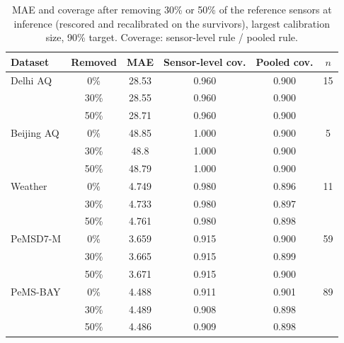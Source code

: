 \begin{table}[htbp]
\caption{MAE and coverage after removing 30\% or 50\% of the reference sensors at inference (rescored and recalibrated on the survivors), largest calibration size, 90\% target. Coverage: sensor-level rule / pooled rule.}
\label{tab:removalfull}
\centering\small
\begin{tabular}{lccccc}
\toprule
\textbf{Dataset} & \textbf{Removed} & \textbf{MAE} & \textbf{Sensor-level cov.} & \textbf{Pooled cov.} & $n$ \\
\midrule
Delhi AQ & 0\% & 28.53 & 0.960 & 0.900 & 15 \\
 & 30\% & 28.55 & 0.960 & 0.900 &  \\
 & 50\% & 28.71 & 0.960 & 0.900 &  \\
\midrule
Beijing AQ & 0\% & 48.85 & 1.000 & 0.900 & 5 \\
 & 30\% & 48.8 & 1.000 & 0.900 &  \\
 & 50\% & 48.79 & 1.000 & 0.900 &  \\
\midrule
Weather & 0\% & 4.749 & 0.980 & 0.896 & 11 \\
 & 30\% & 4.733 & 0.980 & 0.897 &  \\
 & 50\% & 4.761 & 0.980 & 0.898 &  \\
\midrule
PeMSD7-M & 0\% & 3.659 & 0.915 & 0.900 & 59 \\
 & 30\% & 3.665 & 0.915 & 0.899 &  \\
 & 50\% & 3.671 & 0.915 & 0.900 &  \\
\midrule
PeMS-BAY & 0\% & 4.488 & 0.911 & 0.901 & 89 \\
 & 30\% & 4.489 & 0.908 & 0.898 &  \\
 & 50\% & 4.486 & 0.909 & 0.898 &  \\
\bottomrule
\end{tabular}
\end{table}

